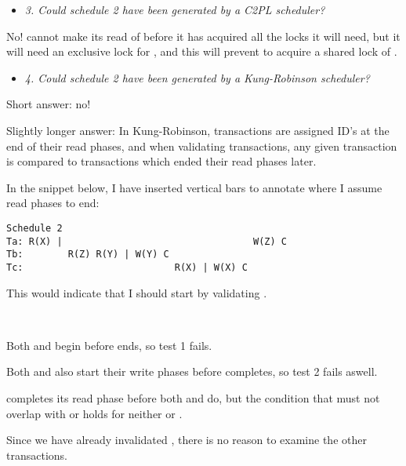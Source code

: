 \begin{itemize}
  \item \textit{3. Could schedule 2 have been generated by a C2PL scheduler?}
\end{itemize}

No!  cannot make its read of  before it has acquired all the locks
it will need, but it will need an exclusive lock for , and this will
prevent  to acquire a shared lock of .


\streg

\begin{itemize}
  \item \textit{4. Could schedule 2 have been generated by a Kung-Robinson
    scheduler?}
\end{itemize}

Short answer: no!

Slightly longer answer: In Kung-Robinson, transactions are assigned ID's at the
end of their read phases, and when validating transactions, any given
transaction is compared to transactions which ended their read phases later.
\medskip

In the snippet below, I have inserted vertical bars to annotate where I assume
read phases to end:


\begin{verbatim}
Schedule 2
Ta: R(X) |                                  W(Z) C
Tb:        R(Z) R(Y) | W(Y) C
Tc:                           R(X) | W(X) C
\end{verbatim}

This would indicate that I should start by validating .

~\smallskip

Both  and  begin before  ends, so test 1 fails. \smallskip

Both  and  also start their write phases before  completes,
so test 2 fails aswell. \smallskip

 completes its read phase before both  and  do, but the
condition that  must not overlap with  or
 holds for neither  or .
\medskip

Since we have already invalidated , there is no reason to examine the
other transactions.

\tykstreg
